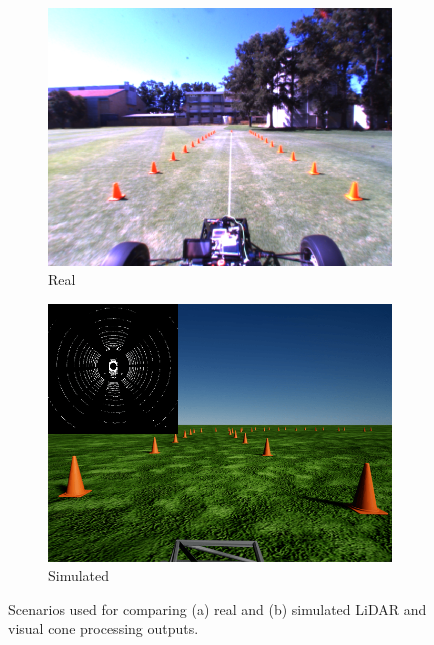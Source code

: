 \begin{figure}[H]
	\centering
	\begin{subfigure}[b]{0.45\textwidth}
		\includegraphics[width=\textwidth]{scenario-real}
		\caption{Real}
		\label{fig:7:sc:real}   
	\end{subfigure} 
	\hspace{1em}         
	\begin{subfigure}[b]{0.45\textwidth}
		\includegraphics[width=\textwidth]{scenario-sim}
		\caption{Simulated}
		\label{fig:7:sc:sim}
	\end{subfigure}             
	\caption[Real and simulated LiDAR scenarios for visual cone processing]{Scenarios used for comparing (a) real and (b) simulated LiDAR and visual cone processing outputs.}
	\label{fig:7:scenarioComparison}
\end{figure}

